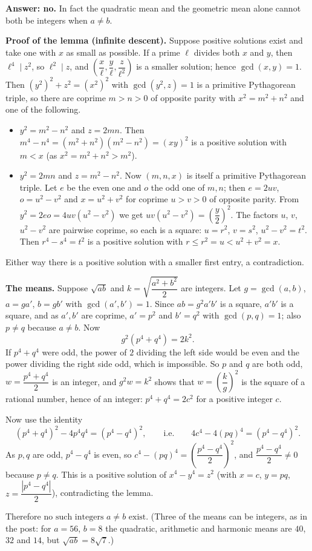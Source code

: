 \textbf{Answer: no.} In fact the quadratic mean and the geometric mean alone cannot both be integers when $a\ne b$.

\textbf{Proof of the lemma (infinite descent).} Suppose positive solutions exist and take one with $x$ as small as possible. If a prime $\ell$ divides both $x$ and $y$, then $\ell^4\mid z^2$, so $\ell^2\mid z$, and $\left(\dfrac {x}{\ell},\dfrac {y}{\ell},\dfrac{z}{\ell^2}\right)$ is a smaller solution; hence $\gcd(x,y)=1$. Then $(y^2)^2+z^2=(x^2)^2$ with $\gcd(y^2,z)=1$ is a primitive Pythagorean triple, so there are coprime $m>n>0$ of opposite parity with $x^2=m^2+n^2$ and one of the following.
\begin{itemize}
\item $y^2=m^2-n^2$ and $z=2mn$. Then $m^4-n^4=(m^2+n^2)(m^2-n^2)=(xy)^2$ is a positive solution with $m<x$ (as $x^2=m^2+n^2>m^2$).
\item $y^2=2mn$ and $z=m^2-n^2$. Now $(m,n,x)$ is itself a primitive Pythagorean triple. Let $e$ be the even one and $o$ the odd one of $m,n$; then $e=2uv$, $o=u^2-v^2$ and $x=u^2+v^2$ for coprime $u>v>0$ of opposite parity. From $y^2=2eo=4uv\left(u^2-v^2\right)$ we get $uv\left(u^2-v^2\right)=\left(\dfrac {y}{2}\right)^2$. The factors $u$, $v$, $u^2-v^2$ are pairwise coprime, so each is a square: $u=r^2$, $v=s^2$, $u^2-v^2=t^2$. Then $r^4-s^4=t^2$ is a positive solution with $r\le r^2=u<u^2+v^2=x$.
\end{itemize}
Either way there is a positive solution with a smaller first entry, a contradiction.

\textbf{The means.} Suppose $\sqrt{ab}$ and $k=\sqrt{\dfrac{a^2+b^2}{2}}$ are integers. Let $g=\gcd(a,b)$, $a=ga'$, $b=gb'$ with $\gcd(a',b')=1$. Since $ab=g^2a'b'$ is a square, $a'b'$ is a square, and as $a',b'$ are coprime, $a'=p^2$ and $b'=q^2$ with $\gcd(p,q)=1$; also $p\ne q$ because $a\ne b$. Now
\[
g^2\left(p^4+q^4\right)=2k^2 .
\]
If $p^4+q^4$ were odd, the power of $2$ dividing the left side would be even and the power dividing the right side odd, which is impossible. So $p$ and $q$ are both odd, $w=\dfrac{p^4+q^4}{2}$ is an integer, and $g^2w=k^2$ shows that $w=\left(\dfrac {k}{g}\right)^2$ is the square of a rational number, hence of an integer: $p^4+q^4=2c^2$ for a positive integer $c$.

Now use the identity
\[
\left(p^4+q^4\right)^2-4p^4q^4=\left(p^4-q^4\right)^2,\qquad\text{i.e.}\qquad 4c^4-4(pq)^4=\left(p^4-q^4\right)^2 .
\]
As $p,q$ are odd, $p^4-q^4$ is even, so $c^4-(pq)^4=\left(\dfrac{p^4-q^4}{2}\right)^2$, and $\dfrac{p^4-q^4}{2}\ne0$ because $p\ne q$. This is a positive solution of $x^4-y^4=z^2$ (with $x=c$, $y=pq$, $z=\dfrac{\left|p^4-q^4\right|}{2}$), contradicting the lemma.

Therefore $\boxed{\text{no such integers }a\ne b\text{ exist}}$. (Three of the means can be integers, as in the post: for $a=56$, $b=8$ the quadratic, arithmetic and harmonic means are $40$, $32$ and $14$, but $\sqrt{ab}=8\sqrt7$.)
